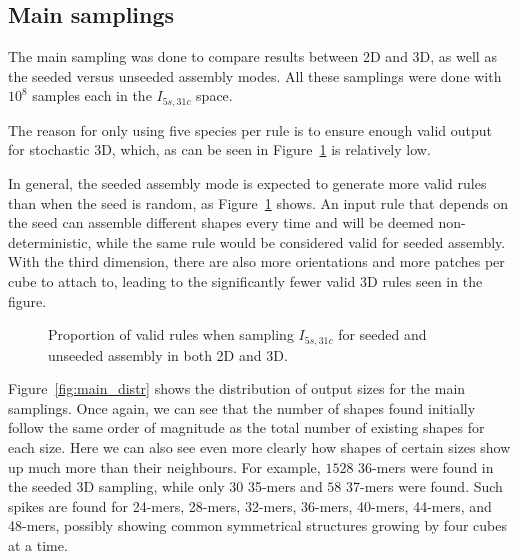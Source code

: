 \subsection{Main samplings}
\label{sec:maincalc}



The main sampling was done to compare results between 2D and 3D, as well as the seeded versus unseeded assembly modes. All these samplings were done with \(10^8\) samples each in the \(I_{5s,31c}\) space.

The reason for only using five species per rule is to ensure enough valid output for stochastic 3D, which, as can be seen in Figure~\ref{fig:valid_proportion} is relatively low. 

In general, the seeded assembly mode is expected to generate more valid rules than when the seed is random, as Figure~\ref{fig:valid_proportion} shows. An input rule that depends on the seed can assemble different shapes every time and will be deemed non-deterministic, while the same rule would be considered valid for seeded assembly.  With the third dimension, there are also more orientations and more patches per cube to attach to, leading to the significantly fewer valid 3D rules seen in the figure.

\begin{figure}[h]
    \centering
    \caption{Proportion of valid rules when sampling \(I_{5s,31c}\) for seeded and unseeded assembly in both 2D and 3D.}
    \label{fig:valid_proportion}
\end{figure}

Figure~\ref{fig:main_distr} shows the distribution of output sizes for the main samplings. Once again, we can see that the number of shapes found initially follow the same order of magnitude as the total number of existing shapes for each size. Here we can also see even more clearly how shapes of certain sizes show up much more than their neighbours. For example, \(1528\) 36-mers were found in the seeded 3D sampling, while only \(30\) 35-mers and \(58\) 37-mers were found. Such spikes are found for 24-mers, 28-mers, 32-mers, 36-mers, 40-mers, 44-mers, and 48-mers, possibly showing common symmetrical structures growing by four cubes at a time.

